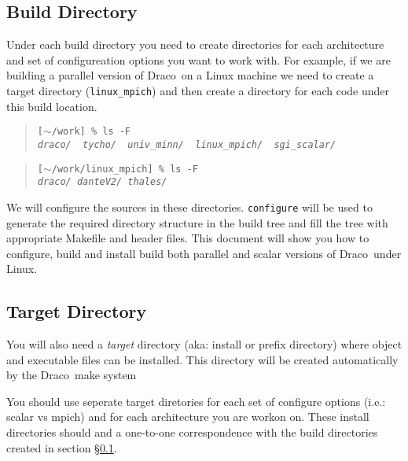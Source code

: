 \documentclass[11pt]{nmemo}
\newcommand{\comp}[1]{\normalfont\footnotesize\texttt{#1}\normalsize}
\newcommand{\draco}{{\normalfont\sffamily Draco}}
\begin{document}
\subsection{Build Directory}
\label{builddir}

Under each build directory you need to create directories for each
architecture and set of configureation options you want to work with.
For example, if we are building a parallel version of \draco\ on a
Linux machine we need to create a target directory (\comp{linux\_mpich})
and then create a directory for each code under this build location.

\footnotesize
\begin{verse}
\texttt{[$\sim$/work] \% ls -F \\
\emph{draco/\ \ tycho/\ \ univ\_minn/\ \ linux\_mpich/\ \ sgi\_scalar/ }}
\end{verse}

\begin{verse}
\texttt{[$\sim$/work/linux\_mpich] \% ls -F \\
\emph{draco/  danteV2/  thales/}}
\end{verse}
\normalsize

We will configure the sources in these directories.  \comp{configure}
will be used to generate the required directory structure in the build
tree and fill the tree with appropriate Makefile and header files.
This document will show you how to configure, build and install build
both parallel and scalar versions of \draco\ under Linux.

\subsection{Target Directory}

You will also need a \emph{target} directory (aka: install or prefix
directory) where object and executable files can be installed.  This
directory will be created automatically by the \draco\ make system

You should use seperate target diretories for each set of configure
options (i.e.: scalar vs mpich) and for each architecture you are
workon on.  These install directories should and a one-to-one
correspondence with the build directories created in section
\S\ref{builddir}.

\end{document}

